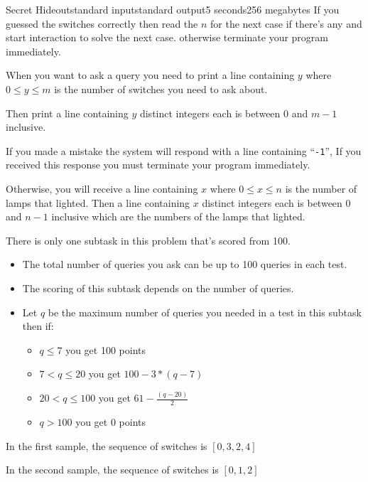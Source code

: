 \begin{problem}{Secret Hideout}{standard input}{standard output}{5 seconds}{256 megabytes}
If you guessed the switches correctly then read the $n$ for the next case if there's any and start interaction to solve the next case. otherwise terminate your program immediately.


\Interaction
When you want to ask a query you need to print a line containing $y$ where $0 \le y \le m$ is the number of switches you need to ask about.

Then print a line containing $y$ distinct integers each is between $0$ and $m-1$ inclusive.

If you made a mistake the system will respond with a line containing ``\texttt{-1}'', If you received this response you must terminate your program immediately.

Otherwise, you will receive a line containing $x$ where  $0 \le x \le n$ is the number of lamps that lighted. Then a line containing $x$ distinct integers each is between $0$ and $n-1$ inclusive which are the numbers of the lamps that lighted.

\Scoring
There is only one subtask in this problem that's scored from 100.

\begin{itemize}
\item The total number of queries you ask can be up to 100 queries in each test.
\item The scoring of this subtask depends on the number of queries.
\item Let $q$ be the maximum number of queries you needed in a test in this subtask then if:
\begin{itemize}
\item $q \le 7$ you get 100 points
\item $7 < q \le 20$ you get $100 - 3*(q-7)$
\item $20 < q \le 100$ you get $61 - \frac{(q-20)}{2}$
\item $q > 100$ you get 0 points
\end{itemize}
\end{itemize}



\Example

\begin{example}
%
\end{example}

\Note
In the first sample, the sequence of switches is $[0,3,2,4]$

In the second sample, the sequence of switches is $[0,1,2]$

\end{problem}

